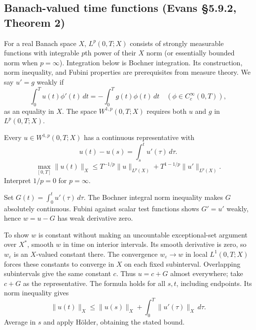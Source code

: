 \subsection{Banach-valued time functions (Evans \S5.9.2, Theorem 2)}
For a real Banach space $X$, $L^p(0,T;X)$ consists of strongly
measurable functions with integrable $p$th power of their $X$ norm
(or essentially bounded norm when $p=\infty$).
Integration below is Bochner integration. Its construction, norm
inequality, and Fubini properties are prerequisites from measure theory.
We say $u'=g$ weakly if
\[
 \int_0^T u(t)\phi'(t)\,dt=-\int_0^Tg(t)\phi(t)\,dt
 \quad(\phi\in C_c^\infty(0,T)),
\]
as an equality in $X$. The space $W^{1,p}(0,T;X)$ requires both
$u$ and $g$ in $L^p(0,T;X)$.

\begin{theorem}\label{thm:5-time-ftc}
Every $u\in W^{1,p}(0,T;X)$ has a continuous representative with
\[
 u(t)-u(s)=\int_s^tu'(\tau)\,d\tau.
\]
\[
 \max_{[0,T]}\|u(t)\|_X
 \leq T^{-1/p}\|u\|_{L^p(X)}
       +T^{1-1/p}\|u'\|_{L^p(X)}.
\]
Interpret $1/p=0$ for $p=\infty$.
\end{theorem}
\begin{expandedproof}
Set $G(t)=\int_0^tu'(\tau)\,d\tau$. The Bochner integral norm
inequality makes $G$ absolutely continuous. Fubini against scalar test
functions shows $G'=u'$ weakly, hence $w=u-G$ has weak derivative zero.

To show $w$ is constant without making an uncountable exceptional-set
argument over $X^*$, smooth $w$ in time on interior intervals.
Its smooth derivative is zero, so $w_\varepsilon$ is an $X$-valued
constant there. The convergence $w_\varepsilon\to w$ in local
$L^1(0,T;X)$ forces these constants to converge in $X$ on each fixed
subinterval. Overlapping subintervals give the same constant $c$.
Thus $u=c+G$ almost everywhere; take $c+G$ as the representative.
The formula holds for all $s,t$, including endpoints.
Its norm inequality gives
\[
 \|u(t)\|_X\leq\|u(s)\|_X+\int_0^T\|u'(\tau)\|_X\,d\tau.
\]
Average in $s$ and apply H\"older, obtaining the stated bound.
\end{expandedproof}
\Needspace{45mm}

